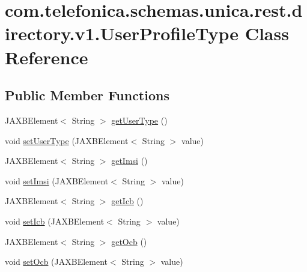 \hypertarget{classcom_1_1telefonica_1_1schemas_1_1unica_1_1rest_1_1directory_1_1v1_1_1UserProfileType}{
\section{com.telefonica.schemas.unica.rest.directory.v1.UserProfileType Class Reference}
\label{classcom_1_1telefonica_1_1schemas_1_1unica_1_1rest_1_1directory_1_1v1_1_1UserProfileType}
}
\subsection*{Public Member Functions}
\begin{DoxyCompactItemize}
\item 
JAXBElement$<$ String $>$ \hyperlink{classcom_1_1telefonica_1_1schemas_1_1unica_1_1rest_1_1directory_1_1v1_1_1UserProfileType_a35a47f28eeb5cc87f87a91857674c12f}{getUserType} ()
\item 
void \hyperlink{classcom_1_1telefonica_1_1schemas_1_1unica_1_1rest_1_1directory_1_1v1_1_1UserProfileType_a38835b3aa9b07446d7480f002913fd6e}{setUserType} (JAXBElement$<$ String $>$ value)
\item 
JAXBElement$<$ String $>$ \hyperlink{classcom_1_1telefonica_1_1schemas_1_1unica_1_1rest_1_1directory_1_1v1_1_1UserProfileType_a9d33f122effed2c3f9a2ab3ae900f6bc}{getImsi} ()
\item 
void \hyperlink{classcom_1_1telefonica_1_1schemas_1_1unica_1_1rest_1_1directory_1_1v1_1_1UserProfileType_aaad0a3bc0ce83451b6f06c14fbd233bb}{setImsi} (JAXBElement$<$ String $>$ value)
\item 
JAXBElement$<$ String $>$ \hyperlink{classcom_1_1telefonica_1_1schemas_1_1unica_1_1rest_1_1directory_1_1v1_1_1UserProfileType_a63e5d180b9f21703a24c66fc356e2eb3}{getIcb} ()
\item 
void \hyperlink{classcom_1_1telefonica_1_1schemas_1_1unica_1_1rest_1_1directory_1_1v1_1_1UserProfileType_aaa554448b747e93c3303860ad162c170}{setIcb} (JAXBElement$<$ String $>$ value)
\item 
JAXBElement$<$ String $>$ \hyperlink{classcom_1_1telefonica_1_1schemas_1_1unica_1_1rest_1_1directory_1_1v1_1_1UserProfileType_a78b7fea9c0022f0ff39a1eac21245b81}{getOcb} ()
\item 
void \hyperlink{classcom_1_1telefonica_1_1schemas_1_1unica_1_1rest_1_1directory_1_1v1_1_1UserProfileType_ae6e65af38b90111497e422e0c790963b}{setOcb} (JAXBElement$<$ String $>$ value)

\end{DoxyCompactItemize}

